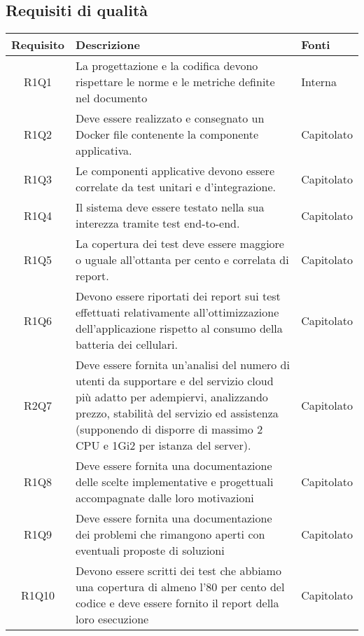 \begin{center}
\begin{longtable}{|c|p{10cm}|p{4cm}|}
	\end{longtable}
\end{center}
\subsection{Requisiti di qualità}
\begin{center}
	\begin{longtable}{|c|p{10cm}|p{4cm}|}
		\hline
		\rowcolor{lighter-grayer}
		\textbf{Requisito} & \textbf{Descrizione} & \textbf{Fonti}  \\
		\hline
		\endhead
		
		 R1Q1 &La progettazione e la codifica devono rispettare le norme e le metriche definite nel documento \dext{Piano di qualifica v1.0.0} & Interna\\
		\hline	
		R1Q2 &Deve essere realizzato e consegnato un Docker file
		contenente la componente applicativa. & Capitolato\\
		\hline
		R1Q3 &Le componenti applicative devono essere correlate da test unitari e d’integrazione. & Capitolato\\
		\hline
		R1Q4 &Il sistema deve essere testato nella sua interezza tramite test end-to-end. & Capitolato\\
		\hline
		R1Q5 &La copertura dei test deve essere maggiore o uguale all'ottanta per cento e correlata di report. & Capitolato\\
		\hline
		R1Q6 &Devono essere riportati dei report sui test effettuati relativamente all’ottimizzazione dell’applicazione rispetto al consumo della
		batteria dei cellulari. & Capitolato\\
		\hline
		R2Q7&	Deve essere fornita un'analisi del numero di utenti da supportare e del servizio cloud più adatto per adempiervi, analizzando prezzo, stabilità del servizio ed assistenza (supponendo di disporre di massimo 2 CPU e 1Gi2 per istanza del server).& Capitolato	\\
		\hline
		R1Q8&Deve essere fornita una documentazione delle scelte implementative e progettuali accompagnate dalle loro motivazioni	& Capitolato	\\
		\hline
		R1Q9	&Deve essere fornita una documentazione dei problemi che rimangono aperti con eventuali proposte di soluzioni	& Capitolato	\\
		\hline
		R1Q10&Devono essere scritti dei test che abbiamo una copertura di almeno l'80 per cento del codice e deve essere fornito il report della loro esecuzione	& 	Capitolato \\
		\hline
		

\end{longtable}
\end{center}
